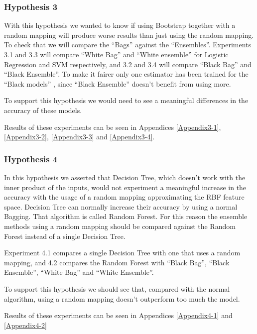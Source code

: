   \begin{pre-delivery}
  \subsubsection*{Hypothesis 3}

  With this hypothesis we wanted to know if using Bootstrap together with a
  random mapping will produce worse results than just using the random
  mapping. To check that we will compare the ``Bags'' against the ``Ensembles''.
  Experiments 3.1 and 3.3 will compare ``White Bag'' and ``White ensemble'' for
  Logistic Regression and SVM respectively, and 3.2 and 3.4 will compare
  ``Black Bag'' and ``Black Ensemble''. To make it fairer only one estimator
  has been trained for the ``Black models'' , since ``Black Ensemble''
  doesn't benefit from using more.

  To support
  this hypothesis we would need to see a meaningful
  differences in the accuracy of these models.

  Results of these experiments can be seen in Appendices
  \ref{Appendix3-1},
  \ref{Appendix3-2},
  \ref{Appendix3-3} and
  \ref{Appendix3-4}.



  \subsubsection*{Hypothesis 4}

  In this hypothesis we asserted that Decision Tree, which doesn't work with
  the inner product of the inputs, would not experiment a meaningful increase
  in the accuracy with the usage of a random mapping approximating the
  RBF feature space. Decision Tree can normally increase their accuracy
  by using a normal Bagging. That algorithm is called Random Forest. For this
  reason the ensemble methods using a random mapping should be compared against
  the Random Forest instead of a single Decision Tree.

  Experiment 4.1 compares a single Decision Tree with one that uses a
  random mapping, and 4.2 compares the Random Forest with
  ``Black Bag'',
  ``Black Ensemble'',
  ``White Bag'' and
  ``White Ensemble''.


  To support this hypothesis we should see that, compared with the normal
  algorithm, using a random mapping doesn't outperform too much the model.

  Results of these experiments can be seen in Appendices \ref{Appendix4-1}
  and \ref{Appendix4-2}
\end{pre-delivery}
